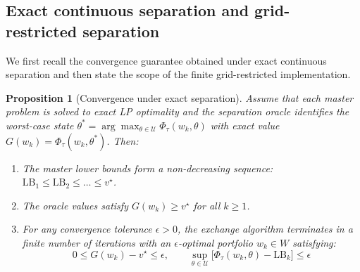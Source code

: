 \documentclass[11pt, a4paper]{article}
\newtheorem{proposition}{Proposition}
\begin{document}
\subsection{Exact continuous separation and grid-restricted separation}
We first recall the convergence guarantee obtained under exact continuous separation and then state the scope of the finite grid-restricted implementation.

\begin{proposition}[Convergence under exact separation]
Assume that each master problem is solved to exact LP optimality and the separation oracle identifies the worst-case state $\theta^* = \arg\max_{\theta \in \mathcal{U}} \Phi_\tau(w_k, \theta)$ with exact value $G(w_k) = \Phi_\tau(w_k, \theta^*)$. Then:
\begin{enumerate}
    \item The master lower bounds form a non-decreasing sequence: $\text{LB}_1 \le \text{LB}_2 \le \dots \le v^\star$.
    \item The oracle values satisfy $G(w_k) \ge v^\star$ for all $k \ge 1$.
    \item For any convergence tolerance $\epsilon > 0$, the exchange algorithm terminates in a finite number of iterations with an $\epsilon$-optimal portfolio $w_k \in W$ satisfying:
    \begin{equation}
        0 \le G(w_k) - v^\star \le \epsilon, \qquad \sup_{\theta \in \mathcal{U}} \bigl[\Phi_\tau(w_k, \theta) - \text{LB}_k\bigr] \le \epsilon
    \end{equation}
\end{enumerate}
\end{proposition}
\end{document}
